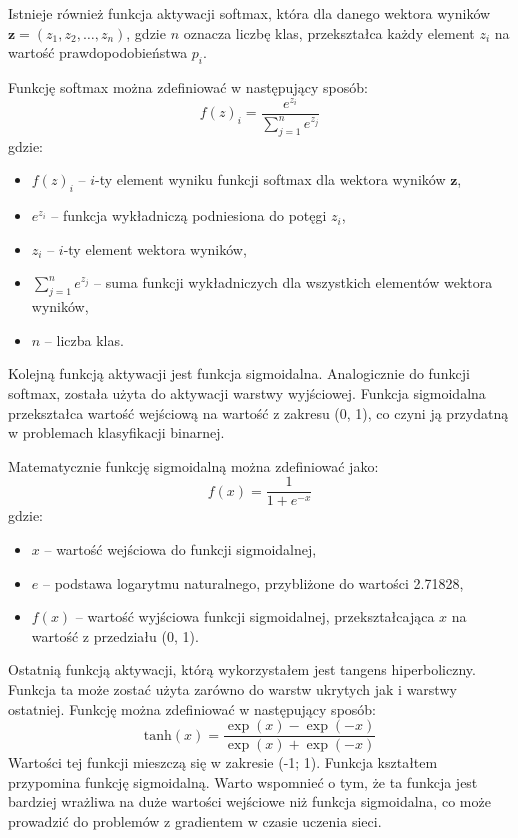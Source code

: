 \documentclass{article}
\begin{document}
Istnieje również funkcja aktywacji softmax, która dla danego wektora wyników \( \mathbf{z} = (z_1, z_2, \ldots, z_n) \), gdzie \( n \) oznacza liczbę klas, przekształca każdy element \( z_i \) na wartość prawdopodobieństwa \( p_i \).

Funkcję softmax można zdefiniować w następujący sposób:
\[
    f(z)_i = \frac{e^{z_i}}{\sum_{j=1}^{n} e^{z_j}}
\]
gdzie:
\begin{itemize}
    \item \(f(z)_i\) -- \(i\)-ty element wyniku funkcji softmax dla wektora wyników \(\mathbf{z}\),
    \item \(e^{z_i}\) -- funkcja wykładniczą podniesiona do potęgi \(z_i\),
    \item \(z_i\) -- \(i\)-ty element wektora wyników,
    \item \(\sum_{j=1}^{n} e^{z_j}\) -- suma funkcji wykładniczych dla wszystkich elementów wektora wyników,
    \item \(n\) -- liczba klas.
\end{itemize}

Kolejną funkcją aktywacji jest funkcja sigmoidalna.
Analogicznie do funkcji softmax, została użyta do aktywacji warstwy wyjściowej.
Funkcja sigmoidalna przekształca wartość wejściową na wartość z zakresu (0, 1), co czyni ją przydatną w problemach klasyfikacji binarnej.

Matematycznie funkcję sigmoidalną można zdefiniować jako:
\[
    f(x) = \frac{1}{1 + e^{-x}}
\]
gdzie:
\begin{itemize}
    \item \(x\) -- wartość wejściowa do funkcji sigmoidalnej,
    \item \(e\) --  podstawa logarytmu naturalnego, przybliżone do wartości 2.71828,
    \item \(f(x)\) -- wartość wyjściowa funkcji sigmoidalnej, przekształcająca \(x\) na wartość z przedziału (0, 1).
\end{itemize}
Ostatnią funkcją aktywacji, którą wykorzystałem jest tangens hiperboliczny.
Funkcja ta może zostać użyta zarówno do warstw ukrytych jak i warstwy ostatniej.
Funkcję można zdefiniować w następujący sposób:
\[\text{tanh}(x) = \frac{{\exp(x) - \exp(-x)}}{{\exp(x) + \exp(-x)}}\]
Wartości tej funkcji mieszczą się w zakresie (-1; 1).
Funkcja kształtem przypomina funkcję sigmoidalną.
Warto wspomnieć o tym, że ta funkcja jest bardziej wrażliwa na duże wartości wejściowe niż funkcja sigmoidalna, co może prowadzić do problemów z gradientem w czasie uczenia sieci.
\end{document}
